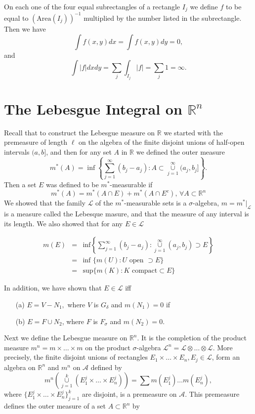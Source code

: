 \documentclass[12pt]{report}
\begin{document}


On each one of the four equal subrectangles of a rectangle $I_j$ we
define $f$  to be equal to $(\text{Area}(I_j))^{-1}$
multiplied by the number listed in the subrectangle. 
Then we have
\[
\int f(x, y) dx = \int f(x, y) dy = 0,
\]
and
\[
\int |f| dx dy = \sum_j \int_{I_j} |f| = \sum_j 1 = \infty.
\]


\section{The Lebesgue Integral on $\mathbb{R}^n$}
Recall that to construct the Lebesgue measure on $\mathbb{R}$ we
started with the premeasure of length $\ell$ on the algebra of the finite
disjoint unions of half-open intervals $(a, b]$, and then for any set $A$
in
$\mathbb{R}$ we defined the outer measure
\[
m^\ast (A) = \inf \left \{ \sum^\infty_{j=1} (b_j - a_j): A \subset
\overset{\infty}{\underset{j=1}{\cup}} (a_j, b_j]\right \}.
\]
Then a set $E$ was defined to be $m^\ast$-measurable if
\[
m^* (A) = m^*(A \cap E) + m^*(A \cap E^c),
\, \forall A\subset \mathbb{R}^n
\]
We showed that the family $\mathcal{L}$ of the $m^*$-measurable
sets is a $\sigma$-algebra, $m = m^*|_{\mathcal{L}}$ is a measure
called the Lebesque masure, and that the measure of any interval is
its length.  We also showed that for any $E \in \mathcal{L}$

\begin{eqnarray*}
m(E) &=& \mbox{inf}\left \{\sum^\infty_{j=1} (b_j - a_j):
\overset{\infty}{\underset{j=1}{\cup}} (a_j, b_j) \supset E \right \}\\
&=& \mbox{inf } \{ m(U): U \mbox{ open } \supset E \}\\
&=& \mbox{sup} \{m(K): K \mbox{ compact} \subset E\}
\end{eqnarray*}

In addition, we have shown that $E \in\mathcal{L}$ iff
\begin{itemize}
\item[(a)]  $E = V - N_1,$ where $V$ is $G_\delta$ and $m(N_1)=0$
if
\item[(b)] $E = F \cup N_2$, where $F$ is $F_\sigma$ and $m(N_2) = 0$.
\end{itemize}

Next we define the Lebesgue measure on $\mathbb{R}^n$.  It is the
completion of the product measure $m^n = m\times \dots \times m$ on
the product $\sigma$-algebra $\mathcal{L}^n = \mathcal{L} \otimes
\dots \otimes \mathcal{L}$.  More precisely, the finite disjoint unions of
rectangles $E_1 \times \dots \times E_n, E_j \in \mathcal{L}$, form an
algebra on $\mathbb{R}^n$ and $m^n$ on $\mathcal{A}$ defined by
\[
m^n \left (\overset{k}{\underset{j=1}{\cup}}(E^j_1 \times \dots \times
E^j_n) \right ) = \sum m(E^j_1) \dots m(E^j_n),
\]
where $\{E^j_1 \times \dots \times E^j_n\}^k_{j=1}$ are disjoint, is a
premeasure on $\mathcal{A}$.  This premeasure defines the outer
measure of a set $A \subset \mathbb{R}^n$ by 
\end{document}

